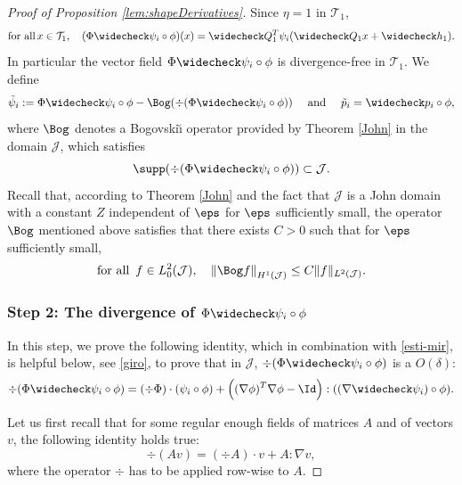 \begin{proof}[Proof of Proposition \ref{lem:shapeDerivatives}]
Since $\eta = 1$ in $\mathcal T_1$,
\begin{equation} \label{soliv-v}
\text{for all} \, x \in \mathcal T_1, \quad
(\Phi \widecheck \psi_i \circ \phi)(x) = \widecheck Q_1^T \psi_i (\widecheck Q_1 x + \widecheck h_1).
\end{equation}
In particular the vector field
$\Phi \widecheck \psi_i \circ \phi$ is divergence-free in $\mathcal T_1$.
We define
\begin{equation} \label{kejetrans}
\tilde \psi_i := \Phi \widecheck \psi_i \circ \phi - \Bog (\div (\Phi \widecheck \psi_i \circ \phi)) \quad \text{ and } \quad
\tilde p_i = \widecheck p_i \circ \phi,
\end{equation}
where $\Bog$ denotes a Bogovski\u{\i} operator provided by Theorem \ref{John} in the domain $\mathcal J$, which satisfies
\begin{equation}\label{support}
\supp(\div(\Phi \widecheck \psi_i \circ \phi)) \subset \mathcal J.
\end{equation}
Recall that, according to Theorem \ref{John} and the fact that
$\mathcal J$ is a John domain with a constant $Z$ independent of $\eps$ for $\eps$ sufficiently small, the operator $\Bog$ mentioned above satisfies that there exists $C>0$ such that for $\eps$ sufficiently small,
\begin{equation} \label{Bog-J}
\text{for all } \, f \in L^2_0(\mathcal J), \quad \left\|\Bog f\right\|_{H^1 (\mathcal J) } \leq C \|f \|_{L^2 (\mathcal J)}.
\end{equation}

\subsubsection*{Step 2: The divergence of $\Phi \widecheck \psi_i \circ \phi$} In this step, we prove the following identity, which in combination with \eqref{esti-mir}, is helpful below, see \eqref{giro}, to prove that in $\mathcal J$,
$\div (\Phi \widecheck \psi_i \circ \phi)$ is a $O(\delta)$:
\begin{equation}\label{idenden}
\div (\Phi \widecheck \psi_i \circ \phi) =
(\div \Phi) \cdot (\psi_i \circ \phi) +
\Big(
(\nabla \phi)^T \nabla \phi - \Id \Big) : ((\nabla \widecheck \psi_i) \circ \phi).
\end{equation}

Let us first recall that for some regular enough fields of matrices $A$ and of vectors $v$, the following identity holds true:
\begin{equation} \label{piola}
\div (Av) = (\div A) \cdot v + A : \nabla v,
\end{equation}
where the operator $\div$ has to be applied row-wise to $A$.


\end{proof}
